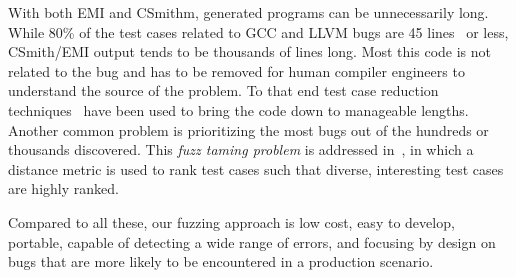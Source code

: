 With both EMI and CSmithm, generated programs can be unnecessarily long. While 80\% of the test cases related to GCC and LLVM bugs are 45 lines~\cite{Sun2016} or less, CSmith/EMI output tends to be thousands of lines long. Most this code is not related to the bug and has to be removed for human compiler engineers to understand the source of the problem. To that end test case reduction techniques~\cite{Regehr2012a,Pflanzer2016} have been used to bring the code down to manageable lengths. Another common problem is prioritizing the most bugs out of the hundreds or thousands discovered. This \emph{fuzz taming problem} is addressed in~\cite{Chen2013}, in which a distance metric is used to rank test cases such that diverse, interesting test cases are highly ranked.

Compared to all these, our fuzzing approach is low cost, easy to develop, portable, capable of detecting a wide range of errors, and focusing by design on bugs that are more likely to be encountered in a production scenario.





